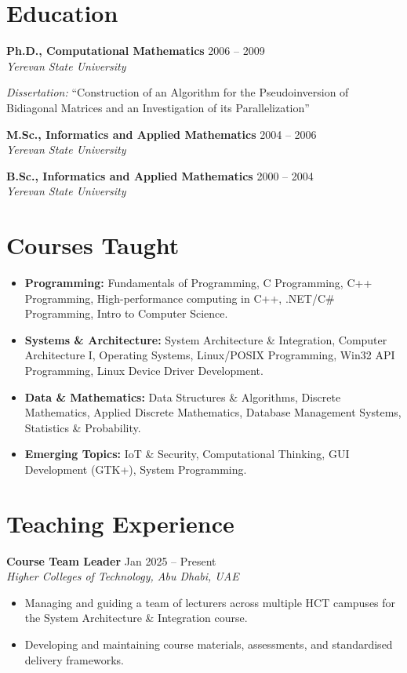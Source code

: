 \documentclass[a4paper,12pt]{article}
\newcommand{\role}[3]{%
  \par\vspace{7pt}\noindent\textbf{#1} \hfill \small\textnormal{#2} \\
  \textit{\small #3}\par\vspace{3pt}%
}
\begin{document}
\section*{Education}

\role{Ph.D., Computational Mathematics}{2006 -- 2009}{Yerevan State University}
\textit{Dissertation:} ``Construction of an Algorithm for the Pseudoinversion of Bidiagonal Matrices and an Investigation of its Parallelization''\\[4pt]
\role{M.Sc., Informatics and Applied Mathematics}{2004 -- 2006}{Yerevan State University}
\role{B.Sc., Informatics and Applied Mathematics}{2000 -- 2004}{Yerevan State University}

\section*{Courses Taught}
\begin{itemize}[leftmargin=*, itemsep=3pt, topsep=3pt]
  \item \textbf{Programming:} Fundamentals of Programming, C Programming, C++ Programming, High-performance computing in C++, .NET/C\# Programming, Intro to Computer Science.
  \item \textbf{Systems \& Architecture:} System Architecture \& Integration, Computer Architecture I, Operating Systems,
        Linux/POSIX Programming, Win32 API Programming, Linux Device Driver Development.
  \item \textbf{Data \& Mathematics:} Data Structures \& Algorithms, Discrete Mathematics, Applied Discrete Mathematics,
        Database Management Systems, Statistics \& Probability.
  \item \textbf{Emerging Topics:} IoT \& Security, Computational Thinking, GUI Development (GTK+), System Programming.
\end{itemize}

\section*{Teaching Experience}

\role{Course Team Leader}{Jan 2025 -- Present}{Higher Colleges of Technology, Abu Dhabi, UAE}
\begin{itemize}[leftmargin=*, noitemsep, topsep=0pt]
  \item Managing and guiding a team of lecturers across multiple HCT campuses for the System Architecture \& Integration course.
  \item Developing and maintaining course materials, assessments, and standardised delivery frameworks.
\end{itemize}
\end{document}
